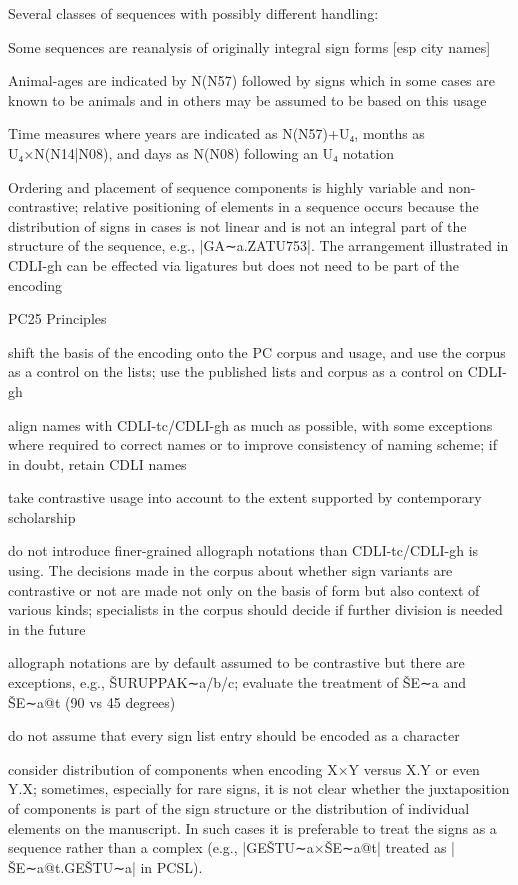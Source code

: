 \Hli{}Several classes of sequences with possibly different handling:

	\Hul\Hli{}Some sequences are reanalysis of originally integral
	  sign forms [esp city names]

\Hli{}Animal-ages are indicated by N(N57) followed by signs
   	  which in some cases are known to be animals and in others
   	  may be assumed to be based on this usage

\Hli{}Time measures where years are indicated as N(N57)+U₄,
  	  months as U₄×N(N14|N08), and days as N(N08) following an U₄
  	  notation

\Hendul


\Hli{}Ordering and placement of sequence components is highly
	variable and non-contrastive; relative positioning of elements
	in a sequence occurs because the distribution of signs in
	cases is not linear and is not an integral part of the
	structure of the sequence, e.g., |GA∼a.ZATU753|.  The
	arrangement illustrated in CDLI-gh can be effected via
	ligatures but does not need to be part of the encoding

\Hendul
\Hhh{}PC25 Principles

\Hul\Hli{}shift the basis of the encoding onto the PC corpus and
 	usage, and use the corpus as a control on the lists; use
 	the published lists and corpus as a control on CDLI-gh

\Hli{}align names with CDLI-tc/CDLI-gh as much as possible, with
	some exceptions where required to correct names or to improve
	consistency of naming scheme; if in doubt, retain CDLI
	names

\Hli{}take contrastive usage into account to the extent
   	supported by contemporary scholarship

\Hli{}do not introduce finer-grained allograph notations than
	CDLI-tc/CDLI-gh is using.  The decisions made in the corpus
	about whether sign variants are contrastive or not are made
	not only on the basis of form but also context of various
	kinds; specialists in the corpus should decide if further
	division is needed in the future

\Hli{}allograph notations are by default assumed to be
	contrastive but there are exceptions, e.g., ŠURUPPAK∼a/b/c;
	evaluate the treatment of ŠE∼a and ŠE∼a@t (90 vs 45 degrees)

\Hli{}do not assume that every sign list entry should be encoded
   	as a character

\Hli{}consider distribution of components when encoding X×Y
	versus X.Y or even Y.X; sometimes, especially for rare signs,
	it is not clear whether the juxtaposition of components is
	part of the sign structure or the distribution of individual
	elements on the manuscript. In such cases it is preferable to
	treat the signs as a sequence rather than a complex (e.g.,
	|GEŠTU∼a×ŠE∼a@t| treated as |ŠE∼a@t.GEŠTU∼a| in PCSL).

